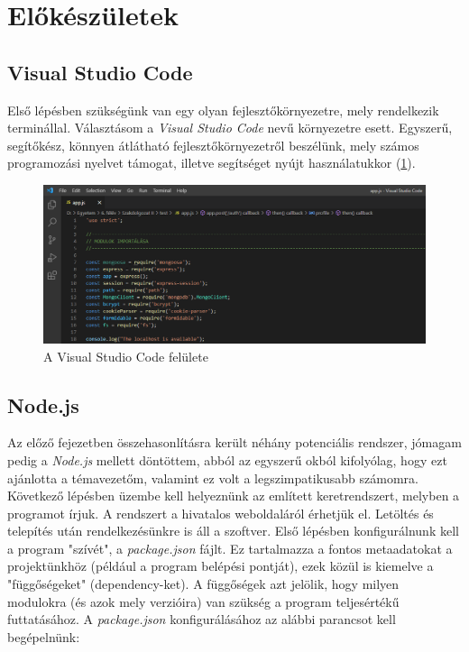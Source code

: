 

\section{Előkészületek}

\subsection{Visual Studio Code}

Első lépésben szükségünk van egy olyan fejlesztőkörnyezetre, mely rendelkezik terminállal. Választásom a \textit{Visual Studio Code} nevű környezetre esett. Egyszerű, segítőkész, könnyen átlátható fejlesztőkörnyezetről beszélünk, mely számos programozási nyelvet támogat, illetve segítséget nyújt használatukkor (\ref{fig:vscode}).

\begin{figure}[h]
	\centering
		\includegraphics[width=15truecm, height=7truecm]{images/vscode.png}
	\caption{A Visual Studio Code felülete}
	\label{fig:vscode}
\end{figure}

\subsection{Node.js}

Az előző fejezetben összehasonlításra került néhány potenciális rendszer, jómagam pedig a \textit{Node.js} mellett döntöttem, abból az egyszerű okból kifolyólag, hogy ezt ajánlotta a témavezetőm, valamint ez volt a legszimpatikusabb számomra. Következő lépésben üzembe kell helyeznünk az említett keretrendszert, melyben a programot írjuk. A rendszert a hivatalos weboldaláról érhetjük el. Letöltés és telepítés után rendelkezésünkre is áll a szoftver. Első lépésben konfigurálnunk kell a program "szívét", a \textit{package.json} fájlt. Ez tartalmazza a fontos metaadatokat a projektünkhöz (például a program belépési pontját), ezek közül is kiemelve a "függőségeket" (dependency-ket). A függőségek azt jelölik, hogy milyen modulokra (és azok mely verzióira) van szükség a program teljesértékű futtatásához. A \textit{package.json} konfigurálásához az alábbi parancsot kell begépelnünk:

